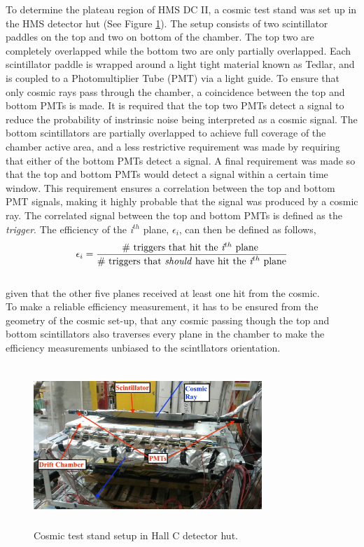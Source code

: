 \documentclass[letterpaper, 12 pt, conference]{ieeeconf}  %
\begin{document}
\indent To determine the plateau region of HMS DC II,  a cosmic test stand was set up in the HMS detector hut (See Figure \ref{fig:cosmic_stand}). The setup consists of two scintillator paddles on the top
and two on bottom of the chamber. The top two are completely overlapped while the bottom two are only partially overlapped. Each scintillator paddle is wrapped around a light tight material known as Tedlar,
and is coupled to a Photomultiplier Tube (PMT) via a light guide. To ensure that only cosmic rays pass through the chamber, a coincidence between the top and bottom PMTs is made. It is required that the top
two PMTs detect a signal to reduce the probability of instrinsic noise being interpreted as a cosmic signal. The bottom scintillators are partially overlapped to achieve full coverage of the chamber active
area, and a less restrictive requirement was made by requiring that either of the bottom PMTs detect a signal. A final requirement was made so that the top and bottom PMTs would detect a signal within a
certain time window. This requirement ensures a correlation between the top and bottom PMT signals, making it highly probable that the signal was produced by a cosmic ray. The correlated signal between the top and
bottom PMTs is defined as the \textit{trigger}. The efficiency of the \textit{i$^{th}$} plane, $\epsilon_{i}$, can then be defined as follows, \\
\begin{align*}
\epsilon_{i} = \frac{\# \text{ triggers that hit the \textit{i$^{th}$} plane } }{\# \text{ triggers that \textit{should} have hit the \textit{i$^{th}$} plane} } 
\end{align*} \\
given that the other five planes received at least one hit from the cosmic. \\
\indent To make a reliable efficiency measurement, it has to be ensured from the geometry of the cosmic set-up, that any cosmic passing though the top and bottom scintillators also traverses every plane in the chamber
to make the efficiency measurements unbiased to the scintllators orientation. 
\begin{figure}[h!]
  \centering
  \includegraphics[width=3.4in, height=2.4in]{dc2_tests/dc2_teststand_03.jpg}
  \caption{Cosmic test stand setup in Hall C detector hut.}
  \label{fig:cosmic_stand}
\end{figure} \\
\end{document}
